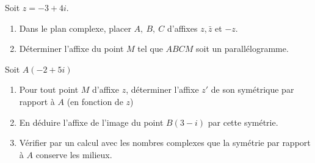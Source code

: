 \documentclass[a4paper,12pt]{article}
\renewcommand{\monlien}[2]{}
\renewcommand{\macible}[1]{}
\begin{document}
\begin{frame}

\macible{exobary}{}

% 
% 
% 
% 
\monlien{bary}{\monbouton{Retour Cours}}
\end{frame}


\begin{frame}

\macible{exosousgeom}{}

\vspace{.2cm}
\EXO %

Soit $z=-3+4i.$
\begin{enumerate}
\item Dans le plan complexe, placer  $A,\ B,\ C$ d'affixes $z, \bar{z}$ et $-z.$
\item D\'eterminer l'affixe du point $M$ tel que $ABCM$ soit un parall\'elogramme.
\end{enumerate}
\end{frame}

\vspace{.2cm}
\EXO

Soit $A(-2+5i)$
\begin{enumerate}
 \item Pour tout point $M$ d'affixe $z$, d\'eterminer l'affixe $z'$ de son sym\'etrique par rapport \`a $A$ (en fonction de $z$)
 \item En d\'eduire l'affixe de l'image du point $B(3-i)$ par cette sym\'etrie. 
\item V\'erifier par un calcul avec les nombres complexes que la sym\'etrie par rapport \`a $A$ conserve les milieux.
\end{enumerate}
\end{document}
